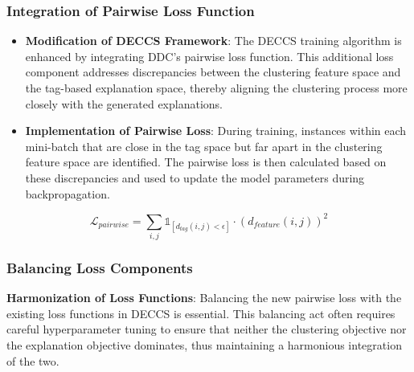 

\subsubsection{Integration of Pairwise Loss Function}
\begin{itemize}
\item \textbf{Modification of DECCS Framework}: The DECCS training algorithm is enhanced by integrating DDC's pairwise loss function. This additional loss component addresses discrepancies between the clustering feature space and the tag-based explanation space, thereby aligning the clustering process more closely with the generated explanations.

\item \textbf{Implementation of Pairwise Loss}: During training, instances within each mini-batch that are close in the tag space but far apart in the clustering feature space are identified. The pairwise loss is then calculated based on these discrepancies and used to update the model parameters during backpropagation.
\end{itemize}

\begin{equation}
\mathcal{L}_{pairwise} = \sum_{i,j} \mathds{1}_{[d_{tag}(i,j) < \epsilon]} \cdot \left( d_{feature}(i,j) \right)^2
\end{equation}

\subsubsection{Balancing Loss Components}
\textbf{Harmonization of Loss Functions}: Balancing the new pairwise loss with the existing loss functions in DECCS is essential. This balancing act often requires careful hyperparameter tuning to ensure that neither the clustering objective nor the explanation objective dominates, thus maintaining a harmonious integration of the two.

